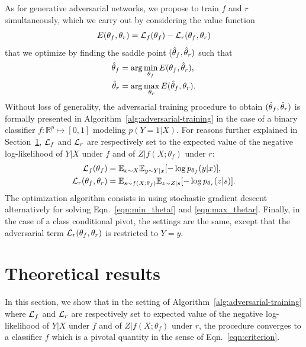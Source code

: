 \documentclass[twocolumn,superscriptaddress,aps]{revtex4-1}
\theoremstyle{plain}
\begin{document}
As for generative adversarial networks, we propose to
train $f$ and $r$ simultaneously, which we carry out by considering
the value function
\begin{equation}
    E(\theta_f, \theta_r) = {\cal L}_f(\theta_f) - {\cal L}_r(\theta_f, \theta_r)
\end{equation}
that we optimize by finding the saddle point $(\smash{\hat\theta_f}, \smash{\hat\theta_r})$ such that
\begin{align}
    \smash{\hat\theta_f} &= \arg \min_{\theta_f} E(\theta_f, \smash{\hat\theta_r}), \label{eqn:min_thetaf} \\
    \smash{\hat\theta_r} &= \arg \max_{\theta_r} E(\smash{\hat\theta_f}, \theta_r) \label{eqn:max_thetar}.
\end{align}
Without loss of generality, the adversarial training procedure to obtain
$(\smash{\hat\theta_f}, \smash{\hat\theta_r})$ is formally presented in
Algorithm~\ref{alg:adversarial-training} in the case of a binary classifier $f :
\mathbb{R}^p \mapsto [0,1]$ modeling $p(Y=1|X)$. For reasons further explained
in Section~\ref{sec:theory}, ${\cal L}_f$ and ${\cal L}_r$  are respectively set to the
expected value of the
negative log-likelihood of $Y|X$ under $f$ and of $Z|f(X;\theta_f)$ under
$r$:
\begin{align}
    {\cal L}_f(\theta_f) &= \mathbb{E}_{x \sim X}  \mathbb{E}_{y \sim Y|x} [ -\log p_{\theta_f} (y|x) ], \\
    {\cal L}_r(\theta_f, \theta_r) &= \mathbb{E}_{s \sim f(X;\theta_f)}  \mathbb{E}_{z \sim Z|s} [-\log p_{\theta_r} (z|s)].
\end{align}
The optimization algorithm consists in using stochastic gradient descent
alternatively for solving Eqn.~\ref{eqn:min_thetaf} and \ref{eqn:max_thetar}.
Finally, in the case of a class conditional pivot, the settings are the
same, except that the adversarial term ${\cal L}_r(\theta_f, \theta_r)$ is restricted to $Y=y$.





\section{Theoretical results}
\label{sec:theory}

In this section, we show that in the setting of
Algorithm~\ref{alg:adversarial-training} where ${\cal L}_f$ and ${\cal L}_r$ are
respectively set to expected value of the negative log-likelihood of $Y|X$ under
$f$ and of $Z|f(X;\theta_f)$ under $r$, the procedure converges to a classifier
$f$ which is a pivotal quantity in the sense of Eqn.~\ref{eqn:criterion}.
\end{document}
